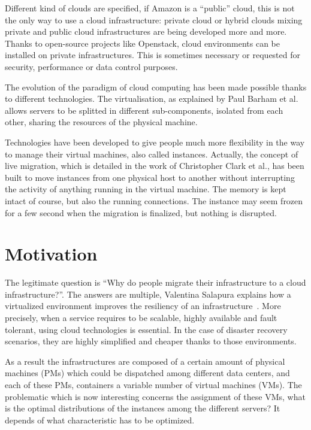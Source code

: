 \documentclass[a4paper,11pt]{article}
\begin{document}
Different kind of clouds are specified, if Amazon is a “public” cloud, this is
not the only way to use a cloud infrastructure: private cloud or hybrid clouds
mixing private and public cloud infrastructures are being developed more and
more. Thanks to open-source projects like Openstack\cite{website:openstack},
cloud environments can be installed on private infrastructures. This is
sometimes necessary or requested for security, performance or data control
purposes.

The evolution of the paradigm of cloud computing has been made possible thanks
to different technologies. The virtualisation, as explained by Paul Barham et
al.\cite{virtualisation} allows servers to be splitted in different
sub-components, isolated from each other, sharing the resources of the physical
machine. 

Technologies have been developed to give people much more flexibility
in the way to manage their virtual machines, also called instances. Actually,
the concept of live migration, which is detailed in the work of Christopher
Clark et al.\cite{livemigration}, has been built to move instances from one
physical host to another without interrupting the activity of anything running
in the virtual machine. The memory is kept intact of course, but also the
running connections.  The instance may seem frozen for a few second when the
migration is finalized, but nothing is disrupted.

\section{Motivation}

The legitimate question is “Why do people migrate their infrastructure to a
cloud infrastructure?”. The answers are multiple, Valentina Salapura explains
how a virtualized environment improves the resiliency of an
infrastructure~\cite{virtresiliency}. More precisely, when a service requires
to be scalable, highly available and fault tolerant, using cloud technologies
is essential. In the case of disaster recovery scenarios, they are highly
simplified and cheaper thanks to those environments.

As a result the infrastructures are composed of a certain amount of physical
machines (PMs) which could be dispatched among different data centers, and each
of these PMs, containers a variable number of virtual machines (VMs). The
problematic which is now interesting concerns the assignment of these VMs, what
is the optimal distributions of the instances among the different servers? It
depends of what characteristic has to be optimized.
\end{document}
